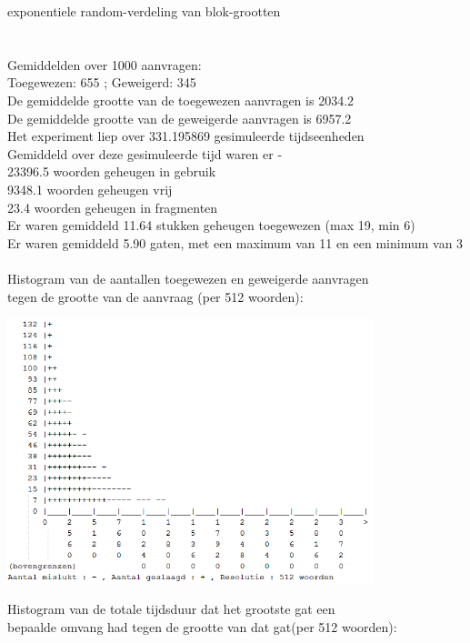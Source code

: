 \documentclass[a4paper]{article}
\begin{document}
			exponentiele random-verdeling van blok-grootten\\
			\\
			\\
			Gemiddelden over 1000 aanvragen:\\
			Toegewezen: 655 ; Geweigerd: 345\\
			De gemiddelde grootte van de toegewezen aanvragen is 2034.2\\
			De gemiddelde grootte van de geweigerde aanvragen is 6957.2\\
			Het experiment liep over 331.195869 gesimuleerde tijdseenheden\\
			Gemiddeld over deze gesimuleerde tijd waren er - \\
			 23396.5 woorden geheugen in gebruik\\
			  9348.1 woorden geheugen vrij\\
			    23.4 woorden geheugen in fragmenten\\
			Er waren gemiddeld    11.64 stukken geheugen toegewezen (max 19, min 6)\\
			Er waren gemiddeld     5.90 gaten, met een maximum van 11 en een minimum van 3\\
			\\
			Histogram van de aantallen toegewezen en geweigerde aanvragen\\
			tegen de grootte van de aanvraag (per 512 woorden):
			\begin{center}
				\includegraphics[width=0.8\textwidth]{ff3.png}
			\end{center}
			Histogram van de totale tijdsduur dat het grootste gat een\\
			bepaalde omvang had tegen de grootte van dat gat(per 512 woorden):
\end{document}

